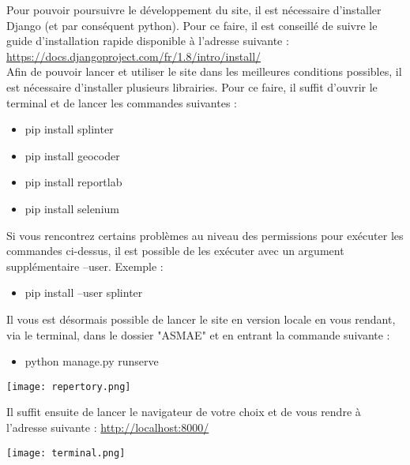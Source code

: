 Pour pouvoir poursuivre le développement du site, il est nécessaire d’installer Django (et par conséquent python). Pour ce faire, il est conseillé de suivre le guide d’installation rapide disponible à l’adresse suivante : \href{https://docs.djangoproject.com/fr/1.8/intro/install/}{https://docs.djangoproject.com/fr/1.8/intro/install/}\\

Afin de pouvoir lancer et utiliser le site dans les meilleures conditions possibles, il est nécessaire d’installer plusieurs librairies. Pour ce faire, il suffit d’ouvrir le terminal et de lancer les commandes suivantes :\\
\begin{itemize}
\item pip install splinter
\item pip install geocoder
\item pip install reportlab
\item pip install selenium\\
\end{itemize}

Si vous rencontrez certains problèmes au niveau des permissions pour exécuter les commandes ci-dessus, il est possible de les exécuter avec un argument supplémentaire --user. Exemple :\\
\begin{itemize}
\item pip install --user splinter\\
\end{itemize}

Il vous est désormais possible de lancer le site en version locale en vous rendant, via le terminal, dans le dossier "ASMAE" et en entrant la commande suivante :\\
\begin{itemize}
\item python manage.py runserve\\
\end{itemize}

\begin{center}
\texttt{[image: repertory.png]}
\end{center}

Il suffit ensuite de lancer le navigateur de votre choix et de vous rendre à l’adresse suivante : \href{http://localhost:8000/}{http://localhost:8000/}

\begin{center}
\texttt{[image: terminal.png]}
\end{center}